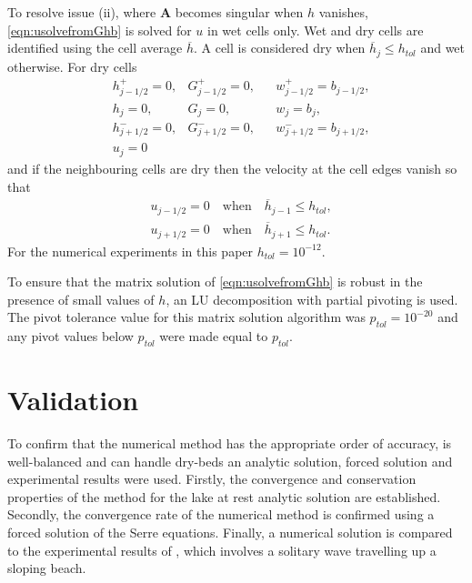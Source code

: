 \documentclass[times]{elsarticle}
\newcommand{\matr}[1]{\mathbf{#1}}
\begin{document}
To resolve issue (ii), where $\matr{A}$ becomes singular when $h$ vanishes, \eqref{eqn:usolvefromGhb} is solved for $u$ in wet cells only. Wet and dry cells are identified using the cell average $\overline{h}$. A cell is considered dry when $\overline{h}_j \le h_{tol}$ and wet otherwise. For dry cells
\begin{align*}
& 	h^+_{j-1/2}  = 0,   & 	G^+_{j-1/2}  = 0, & & 	w^+_{j-1/2}  = b_{j-1/2},   \\
&	h_{j} = 0, & 	G_{j}  = 0,  & 	&w_{j}  = b_{j},\\
& 	h^-_{j+1/2}  = 0,  & 	G^-_{j+1/2}  = 0, & 	&w^-_{j+1/2}  = b_{j+1/2}, \\
& u_j = 0
\end{align*}
and if the neighbouring cells are dry then the velocity at the cell edges vanish so that
\begin{align*}
& 	u_{j-1/2}  = 0  \quad \text{when} \quad\overline{h}_{j-1}\le h_{tol}, \\
& 	u_{j+1/2}  = 0  \quad\text{when}\quad\overline{h}_{j+1} \le h_{tol}.
\end{align*}
For the numerical experiments in this paper $h_{tol} = 10^{-12}$.

To ensure that the matrix solution of \eqref{eqn:usolvefromGhb} is robust in the presence of small values of $h$, an LU decomposition with partial pivoting \cite{NumRecC-1996} is used. The pivot tolerance value for this matrix solution algorithm was $p_{tol}=10^{-20}$ and any pivot values below $p_{tol}$ were made equal to $p_{tol}$. 

\section{Validation}
To confirm that the numerical method has the appropriate order of accuracy, is well-balanced and can handle dry-beds an analytic solution, forced solution and experimental results were used. Firstly, the convergence and conservation properties of the method for the lake at rest analytic solution are established. Secondly, the convergence rate of the numerical method is confirmed using a forced solution of the Serre equations. Finally, a numerical solution is compared to the experimental results of \citet{Synolakis-1987-523}, which involves a solitary wave travelling up a sloping beach.
\end{document}
